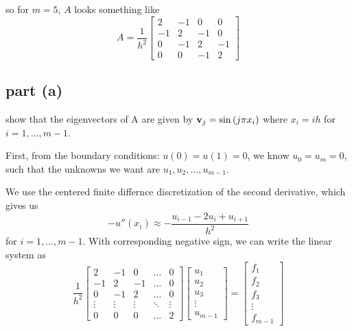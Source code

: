 \documentclass[12pt]{article}
\begin{document}
so for $m=5$, $A$ looks something like
\begin{equation}
    A = \dfrac{1}{h^2} \begin{bmatrix}
    2 & -1 & 0 & 0 \\
    -1 & 2 & -1 & 0 \\
    0 & -1 & 2 & -1 \\
    0 & 0 & -1 & 2
    \end{bmatrix}
\end{equation}

\subsection{part (a)}
 show that the eigenvectors of A are given by ${\bf v}_j = \sin\left(j \pi x_i \right)$ where $x_i = ih$ for $i = 1, \ldots, m-1$.

First, from the boundary conditions: $u(0) = u(1) = 0$, we know $u_0 = u_m = 0$, such that the unknowns we want are  $u_1, u_2, \ldots, u_{m-1}$.

We use the centered finite differnce discretization of the second derivative, which gives us
\begin{equation}
    -u''(x_i) \approx -\dfrac{u_{i-1} - 2u_i + u_{i+1}}{h^2}
\end{equation}
for $i = 1, \ldots, m-1$. With corresponding negative sign, we can write the linear system as
\begin{equation}
    \dfrac{1}{h^2} \begin{bmatrix}
    2 & -1 & 0 & \ldots & 0 \\
    -1 & 2 & -1 & \ldots & 0 \\
    0 & -1 & 2 & \ldots & 0 \\
    \vdots & \vdots & \vdots & \ddots & \vdots \\
    0 & 0 & 0 & \ldots & 2
    \end{bmatrix} \begin{bmatrix}
    u_1 \\
    u_2 \\
    u_3 \\
    \vdots \\
    u_{m-1}
    \end{bmatrix} = \begin{bmatrix}
    f_1 \\
    f_2 \\
    f_3 \\
    \vdots \\
    f_{m-1}
    \end{bmatrix}
\end{equation}
\end{document}
